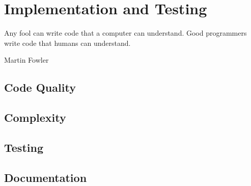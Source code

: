 \chapter{Implementation and Testing} %
\epigraph{Any fool can write code that a computer can understand. Good programmers write code that humans can understand.}{Martin Fowler}
\section{Code Quality}
\section{Complexity}
\section{Testing}
\section{Documentation}

